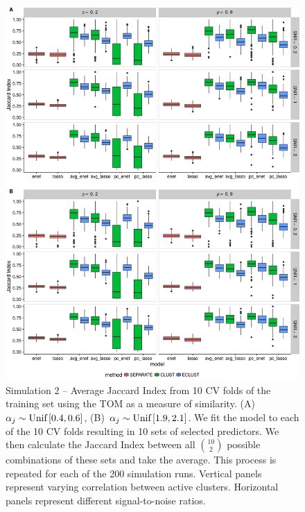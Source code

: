 \begin{figure}[H]
	\centering
	\includegraphics[scale=0.55, keepaspectratio]{./figs/hydra/results/figures/sim2-sept8/jacc_TOM_sim2.png}
	\caption{Simulation 2 -- Average Jaccard Index from 10 CV folds of the training set using the TOM as a measure of similarity. \mbox{(A) $\alpha_{j} \sim \textrm{{Unif}}\left[0.4, 0.6\right]$}, \mbox{(B) $\alpha_{j} \sim \textrm{{Unif}}\left[1.9, 2.1\right]$}. We fit the model to each of the 10 CV folds resulting in 10 sets of selected predictors. We then calculate the Jaccard Index between all $\binom{10}{2}$ possible combinations of these sets and take the average. This process is repeated for each of the 200 simulation runs. Vertical panels represent varying correlation between active clusters. Horizontal panels represent different signal-to-noise ratios.}
	\label{fig:jacc_TOM_sim2}
\end{figure}


